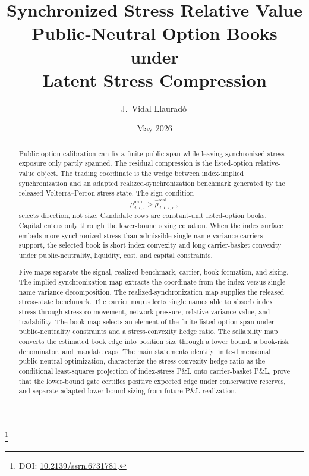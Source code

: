 \documentclass[11pt,a4paper]{amsart}
\theoremstyle{plain}
\theoremstyle{definition}
\theoremstyle{remark}
\begin{document}
\title[Synchronized Stress Relative Value]{%
Synchronized Stress Relative Value\\[0.3em]
{\small Public-Neutral Option Books under\\[0.1em] Latent Stress Compression}}
\author[J.~Vidal Llaurad\'o]{J.~Vidal Llaurad\'o\,}
\thanks{DOI: \href{https://doi.org/10.2139/ssrn.6731781}{10.2139/ssrn.6731781}.}
\date{May 2026}

\begin{abstract}
Public option calibration can fix a finite public span while leaving synchronized-stress exposure
only partly spanned.  The residual compression is the listed-option relative-value object.  The
trading coordinate is the wedge between index-implied synchronization and an adapted
realized-synchronization benchmark generated by the released Volterra--Perron stress state.  The
sign condition
\[
        \rho^{\mathrm{imp}}_{d,I,\tau}>\widehat\rho^{\mathrm{real}}_{d,I,\tau,w},
\]
selects direction, not size.  Candidate rows are constant-unit listed-option books.  Capital enters
only through the lower-bound sizing equation.  When the index surface embeds more synchronized
stress than admissible single-name variance carriers support, the selected book is short index
convexity and long carrier-basket convexity under public-neutrality, liquidity, cost, and capital
constraints.

Five maps separate the signal, realized benchmark, carrier, book formation, and sizing.  The
implied-synchronization map extracts the coordinate from the index-versus-single-name variance
decomposition.  The realized-synchronization map supplies the released stress-state benchmark.
The carrier map selects single names able to absorb index stress through stress co-movement,
network pressure, relative variance value, and tradability.  The book map selects an element of
the finite listed-option span under public-neutrality constraints and a stress-convexity hedge
ratio.
The sellability map converts the estimated book edge into position size through a lower bound, a
book-risk denominator, and mandate caps.  The main statements identify finite-dimensional
public-neutral optimization, characterize the stress-convexity hedge ratio as the conditional
least-squares projection of index-stress P\&L onto carrier-basket P\&L, prove that the
lower-bound gate certifies positive expected edge under conservative reserves, and separate
adapted lower-bound sizing from future P\&L realization.


\end{abstract}
\end{document}
